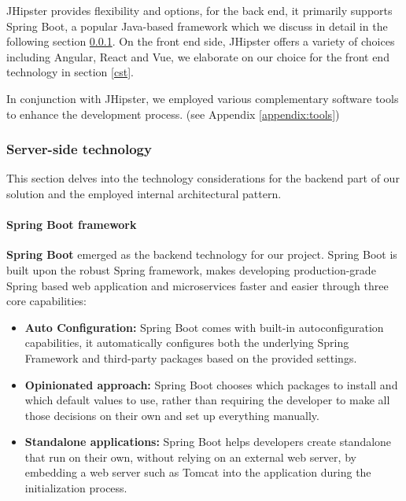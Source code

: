 JHipster provides flexibility and options, for the back end, it primarily supports Spring Boot,
a popular Java-based framework which we discuss in detail in the following section \ref{sst}. On the front end
side, JHipster offers a variety of choices including Angular, React and Vue, we elaborate on our choice for
the front end technology in section \ref{cst}.

In conjunction with JHipster, we employed various complementary software tools to enhance
the development process. (see Appendix \ref{appendix:tools})

\subsubsection{Server-side technology}
\label{sst}
This section delves into the technology considerations for the backend part of our solution and the
employed internal architectural pattern. \\

\paragraph{Spring Boot framework} \mbox{} \newline \newline
\textbf{Spring Boot} emerged as the backend technology for our project.
Spring Boot is built upon the robust Spring framework, makes developing production-grade Spring based
web application and microservices faster and easier through three core capabilities:

\begin{itemize}
      \item \textbf{Auto Configuration:} Spring Boot comes with built-in autoconfiguration capabilities,
            it automatically configures both the underlying Spring Framework and third-party packages based
            on the provided settings.
      \item \textbf{Opinionated approach:}  Spring Boot chooses which packages to install and which default
            values to use, rather than requiring the developer to make all those decisions on their own and set
            up everything manually.
      \item \textbf{Standalone applications:} Spring Boot helps developers create standalone
            that run on their own, without relying on an external web server, by embedding a web server such as
            Tomcat into the application during the initialization process.
\end{itemize}

